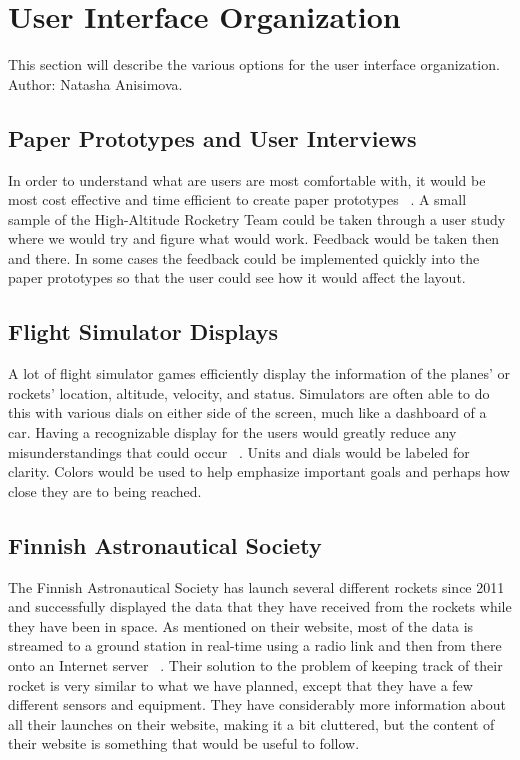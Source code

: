 \documentclass[10pt,draftclsnofoot,onecolumn]{IEEEtran}
\begin{document}
	
	\section{User Interface Organization}
	This section will describe the various options for the user interface organization. Author: Natasha Anisimova.
	
	\subsection{Paper Prototypes and User Interviews}
	In order to understand what are users are most comfortable with, it would be most cost effective and time efficient
	to create paper prototypes ~\cite{what-is-prototyping}. 
	A small sample of the High-Altitude Rocketry Team could be taken through a user study where we would try and figure
	what would work. 
	Feedback would be taken then and there.
	In some cases the feedback could be implemented quickly into the paper prototypes so that the user could see how it
	would affect the layout.
	
	\subsection{Flight Simulator Displays}
	A lot of flight simulator games efficiently display the information of the planes' or rockets' location, altitude,
	velocity, and status.
	Simulators are often able to do this with various dials on either side of the screen, much like a dashboard of a car.
	Having a recognizable display for the users would greatly reduce any misunderstandings that could occur ~\cite{flight-simulation-in-aerospace}. 
	Units and dials would be labeled for clarity. 
	Colors would be used to help emphasize important goals and perhaps how close they are to being reached.
	
	\subsection{Finnish Astronautical Society}
	The Finnish Astronautical Society has launch several different rockets since 2011 and successfully displayed the
	data that they have received from the rockets while they have been in space. 
	As mentioned on their website, most of the data is streamed to a ground station in real-time using a radio link and
	then from there onto an Internet server ~\cite{real-time-rocket-telementry-experiment}. 
	Their solution to the problem of keeping track of their rocket is very similar to what we have planned, except that they
	have a few different sensors and equipment.
	They have considerably more information about all their launches on their website, making it a bit cluttered, but the 
	content of their website is something that would be useful to follow.
	
\end{document}
